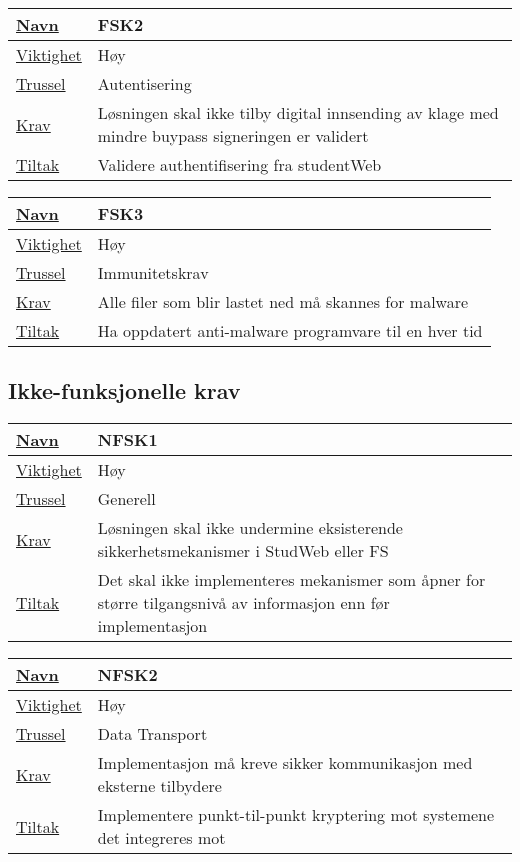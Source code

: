 \begin{tabularx}{\textwidth}{|l|X|}
  \hline
  \underline{Navn} & FSK2 \\ \hline
  \underline{Viktighet} & Høy \\ \hline
  \underline{Trussel} & Autentisering \\ \hline
  \underline{Krav} & Løsningen skal ikke tilby digital innsending av klage med mindre buypass signeringen er validert \\ \hline
  \underline{Tiltak} & Validere authentifisering fra studentWeb \\ \hline
\end{tabularx}

\begin{tabularx}{\textwidth}{|l|X|}
  \hline
  \underline{Navn} & FSK3 \\ \hline
  \underline{Viktighet} & Høy \\ \hline
  \underline{Trussel} & Immunitetskrav \\ \hline
  \underline{Krav} & Alle filer som blir lastet ned må skannes for malware \\ \hline
  \underline{Tiltak} & Ha oppdatert anti-malware programvare til en hver tid \\ \hline
\end{tabularx}


\subsection{Ikke-funksjonelle krav}

\begin{tabularx}{\textwidth}{|l|X|}
  \hline
  \underline{Navn} & NFSK1 \\ \hline
  \underline{Viktighet} & Høy \\ \hline
  \underline{Trussel} & Generell \\ \hline
  \underline{Krav} & Løsningen skal ikke undermine eksisterende sikkerhetsmekanismer i StudWeb eller FS \\ \hline
  \underline{Tiltak} & Det skal ikke implementeres mekanismer som åpner for større tilgangsnivå av informasjon enn før implementasjon \\ \hline
\end{tabularx}

\begin{tabularx}{\textwidth}{|l|X|}
  \hline
  \underline{Navn} & NFSK2 \\ \hline
  \underline{Viktighet} & Høy \\ \hline
  \underline{Trussel} & Data Transport \\ \hline
  \underline{Krav} & Implementasjon må kreve sikker kommunikasjon med eksterne tilbydere \\ \hline
  \underline{Tiltak} & Implementere punkt-til-punkt kryptering mot systemene det integreres mot \\ \hline
\end{tabularx}



